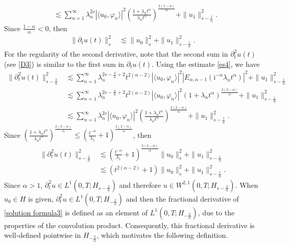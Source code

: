 \documentclass[reqno]{amsart}
\makeatletter
\renewenvironment{proof}[1][\proofname]{\par
  \pushQED{\qed}%
  \normalfont \topsep6\p@\@plus6\p@\relax
  \trivlist
  \item[\hskip\labelsep\bfseries #1\@addpunct{.}]%
}{%
  \popQED\endtrivlist\@endpefalse
}
\numberwithin{equation}{section}
\makeatother
\begin{document}
\begin{proof}
\begin{align}
		&\lesssim \sum_{n=1}^{\infty}\lambda_{n}^{2s}|\langle u_0,\varphi_{n}\rangle|^2\left(\frac{1+\lambda_n t^\alpha}{\lambda_n t^\alpha}\right)^{\frac{2(1-\alpha)}{\alpha}}+\|u_1\|_{s-\frac{1}{\alpha}}^2. \nonumber
	\end{align}
	Since $\frac{1-\alpha}{\alpha}<0$, then 
	\begin{align}
		\|\partial_t u(t)\|^2_{s} &\lesssim\|u_0\|_{s}^2+\|u_1\|_{s-\frac{1}{\alpha}}^2. \nonumber
	\end{align}
	For the regularity of the second derivative, note that the second sum in $\partial_t^2 u(t)$ (see \eqref{D3}) is similar to the first sum in $\partial_t u(t)$. Using the estimate \eqref{es4}, we have
	\begin{align}
		\|\partial_t^2 u(t)\|^2_{s-\frac{2}{\alpha}}&\lesssim \sum_{n=1}^{\infty}\lambda_{n}^{2s-\frac{4}{\alpha}+2}t^{2(\alpha-2)}|\langle u_0,\varphi_{n}\rangle|^2|E_{\alpha, \alpha-1}\left(\mathrm{i}^{-\alpha}\lambda_n t^\alpha\right)|^2+\|u_1\|_{s-\frac{1}{\alpha}}^2  \nonumber\\
		&\lesssim \sum_{n=1}^{\infty}\lambda_{n}^{2s-\frac{4}{\alpha}+2}t^{2(\alpha-2)}|\langle u_0,\varphi_{n}\rangle|^2\left(1+\lambda_n t^\alpha\right)^{\frac{2(2-\alpha)}{\alpha}}+\|u_1\|_{s-\frac{1}{\alpha}}^2  \nonumber\\
		&\lesssim \sum_{n=1}^{\infty}\lambda_{n}^{2s}|\langle u_0,\varphi_{n}\rangle|^2\left(\frac{1+\lambda_n t^\alpha}{\lambda_n t^\alpha}\right)^{\frac{2(2-\alpha)}{\alpha}}+\|u_1\|_{s-\frac{1}{\alpha}}^2.  \nonumber
	\end{align}
	Since $\left(\frac{1+\lambda_n t^\alpha}{\lambda_n t^\alpha}\right)^{\frac{2(2-\alpha)}{\alpha}}\leq \left(\frac{t^{-\alpha}}{\lambda_{1}}+1\right)^{\frac{2(2-\alpha)}{\alpha}}$, then 
	\begin{align}
		\|\partial_t^2 u(t)\|^2_{s-\frac{2}{\alpha}} &\lesssim \left(\frac{t^{-\alpha}}{\lambda_{1}}+1\right)^{\frac{2(2-\alpha)}{\alpha}}\|u_0\|_{s}^2+\|u_1\|_{s-\frac{1}{\alpha}}^2\nonumber\\
		&\lesssim \left(t^{2(\alpha-2)}+1\right)\|u_0\|_{s}^2+\|u_1\|_{s-\frac{1}{\alpha}}^2.  \nonumber
	\end{align}
	Since $\alpha>1$, $\partial_t^2 u\in L^1\left(0,T; H_{s-\frac{2}{\alpha}}\right)$ and therefore $u\in W^{2,1}\left(0,T; H_{s-\frac{2}{\alpha}}\right)$.
\end{proof}
When $u_0 \in H$ is given, $\partial_t^2 u\in L^1\left(0,T; H_{-\frac{2}{\alpha}}\right)$ and then the fractional derivative of \eqref{solution formula3} is defined as an element of $L^1\left(0, T; H_{-\frac{2}{\alpha}}\right)$, due to the properties of the convolution product. Consequently, this fractional derivative is well-defined pointwise in $H_{-\frac{2}{\alpha}}$, which motivates the following definition.
\end{document}
